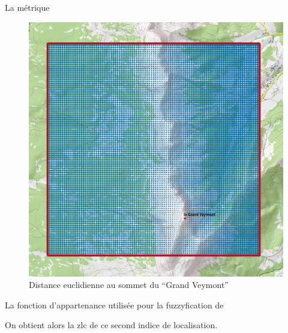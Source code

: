 La métrique

\begin{figure}
  \centering
  \includegraphics{./figures/Metrique_sous_GrandVeymont.png}
  \caption{Distance euclidienne au sommet du \enquote{Grand Veymont}}
  \label{fig:Metrique_alt_GrandVeymont}
\end{figure}


La fonction d'appartenance utilisée pour la fuzzyfication de  

%   

On obtient alors la \ac{zlc} de ce second indice de localisation.

